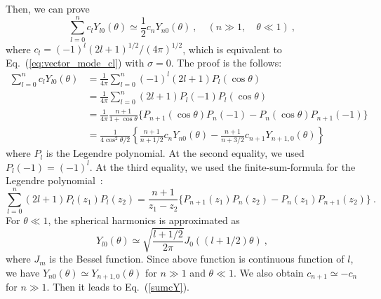 \documentclass[a4paper,11pt]{article}
\begin{document}
    Then, we can prove
    \begin{equation}
     \sum_{l=0}^n c_l Y_{l0}(\theta) \simeq  \frac{1}{2} c_n Y_{n0}(\theta)\ ,\quad (n\gg1,\quad \theta \ll 1)\ ,
    \label{sumcY}
    \end{equation}
    where $c_l=(-1)^l (2l+1)^{1/2}/(4\pi)^{1/2}$, which is equivalent to  Eq.~(\ref{eq:vector_mode_cl}) with $\sigma=0$.
    The proof is the follows:
    \begin{equation}
        \begin{split}
         \sum_{l=0}^n c_l Y_{l0}(\theta)
        &=\frac{1}{4\pi}\sum_{l=0}^n (-1)^l (2l+1) P_l(\cos \theta)\\
        &=\frac{1}{4\pi}\sum_{l=0}^n  (2l+1) P_l(-1) P_l(\cos \theta)\\
        &=\frac{1}{4\pi}\frac{n+1}{1+\cos\theta}\{P_{n+1}(\cos\theta)P_n(-1)-P_{n}(\cos\theta)P_{n+1}(-1)\}\\
        &=\frac{1}{4\cos^2\theta/2}\left\{
        \frac{n+1}{n+1/2} c_n Y_{n0}(\theta)- \frac{n+1}{n+3/2} c_{n+1}Y_{n+1,0}(\theta)
        \right\}
        \end{split}
    \end{equation}
    where $P_l$ is the Legendre polynomial. At the second equality, we used $P_l(-1)=(-1)^l$. 
    At the third equality, we used the finite-sum-formula for the Legendre polynomial~\cite{Legendre}:
\begin{equation}
    \sum_{l=0}^n (2l+1)P_l(z_1)P_l(z_2)=\frac{n+1}{z_1-z_2}\{P_{n+1}(z_1)P_{n}(z_2)-P_{n}(z_1)P_{n+1}(z_2)\}\ .
\end{equation}
    For $\theta\ll 1$, the spherical harmonics is approximated as 
    \begin{equation}
     Y_{l0}(\theta)\simeq \sqrt{\frac{l+1/2}{2\pi}} J_0((l+1/2)\theta)\ ,
    \label{Yapprox}
    \end{equation}
    where $J_m$ is the Bessel function. Since above function is continuous function of $l$, we have $Y_{n0}(\theta) \simeq Y_{n+1,0}(\theta)$ for $n\gg1$ and $\theta \ll 1$.
    We also obtain $c_{n+1}\simeq - c_n$ for $n\gg1$. Then it leads to Eq.~(\ref{sumcY}).
\end{document}

